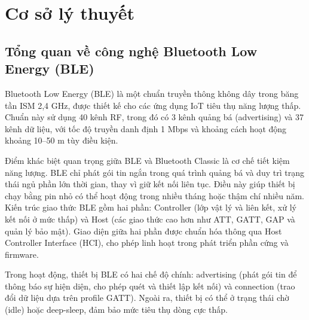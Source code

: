 \fontsize{13}{14}\selectfont
\section{Cơ sở lý thuyết}
\subsection{Tổng quan về công nghệ Bluetooth Low Energy (BLE)}

Bluetooth Low Energy (BLE) là một chuẩn truyền thông không dây trong băng tần ISM 2,4 GHz, được thiết kế cho các ứng dụng IoT tiêu thụ năng lượng thấp. Chuẩn này sử dụng 40 kênh RF, trong đó có 3 kênh quảng bá (advertising) và 37 kênh dữ liệu, với tốc độ truyền danh định 1 Mbps và khoảng cách hoạt động khoảng 10–50 m tùy điều kiện.

Điểm khác biệt quan trọng giữa BLE và Bluetooth Classic là cơ chế tiết kiệm năng lượng. BLE chỉ phát gói tin ngắn trong quá trình quảng bá và duy trì trạng thái ngủ phần lớn thời gian, thay vì giữ kết nối liên tục. Điều này giúp thiết bị chạy bằng pin nhỏ có thể hoạt động trong nhiều tháng hoặc thậm chí nhiều năm.
Kiến trúc giao thức BLE gồm hai phần: Controller (lớp vật lý và liên kết, xử lý kết nối ở mức thấp) và Host (các giao thức cao hơn như ATT, GATT, GAP và quản lý bảo mật). Giao diện giữa hai phần được chuẩn hóa thông qua Host Controller Interface (HCI), cho phép linh hoạt trong phát triển phần cứng và firmware.

Trong hoạt động, thiết bị BLE có hai chế độ chính: advertising (phát gói tin để thông báo sự hiện diện, cho phép quét và thiết lập kết nối) và connection (trao đổi dữ liệu dựa trên profile GATT). Ngoài ra, thiết bị có thể ở trạng thái chờ (idle) hoặc deep-sleep, đảm bảo mức tiêu thụ dòng cực thấp.